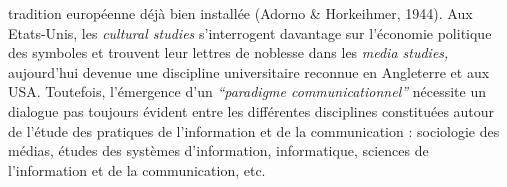 tradition europ\'eenne d\'ej\`a bien install\'ee (Adorno \& Horkeihmer,
1944). Aux Etats-Unis, les \textit{cultural studies }\cite{Hall1970}
s{\textquoteright}interrogent davantage sur
l{\textquoteright}\'economie politique des symboles et trouvent leur
lettres de noblesse dans les \textit{media studies,
}aujourd{\textquoteright}hui devenue une discipline universitaire
reconnue en Angleterre et aux USA. Toutefois,
l{\textquoteright}\'emergence d{\textquoteright}un
\textit{{\textquotedblleft}paradigme
communicationnel{\textquotedblright} }\cite{Bougnoux1998} n\'ecessite un
dialogue pas toujours \'evident entre les diff\'erentes disciplines
constitu\'ees autour de l{\textquoteright}\'etude des pratiques de
l{\textquoteright}information et de la communication : sociologie des
m\'edias, \'etudes des syst\`emes d{\textquoteright}information,
informatique, sciences de l{\textquoteright}information et de la
communication, etc. 

